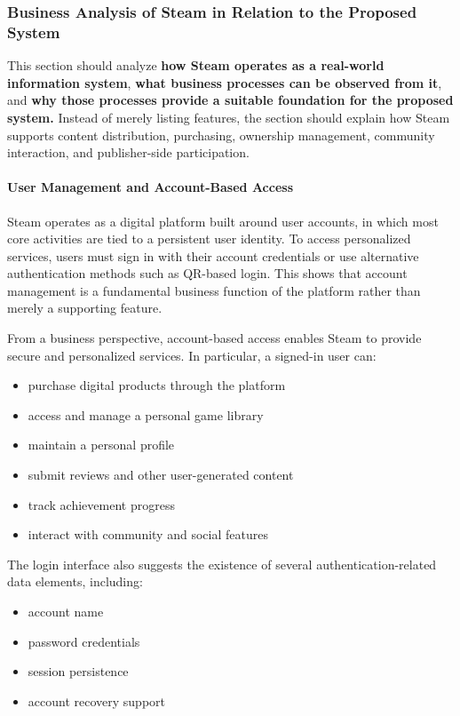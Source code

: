 \subsubsection{Business Analysis of Steam in Relation to the Proposed System}
This section should analyze \textbf{how Steam operates as a real-world information system}, \textbf{what business processes can be observed from it}, and \textbf{why those processes provide a suitable foundation for the proposed system.} Instead of merely listing features, the section should explain how Steam supports content distribution, purchasing, ownership management, community interaction, and publisher-side participation.
\paragraph{User Management and Account-Based Access}
Steam operates as a digital platform built around user accounts, in which most core activities are tied to a persistent user identity. To access personalized services, users must sign in with their account credentials or use alternative authentication methods such as QR-based login. This shows that account management is a fundamental business function of the platform rather than merely a supporting feature.

From a business perspective, account-based access enables Steam to provide secure and personalized services. In particular, a signed-in user can:
\begin{itemize}
    \item purchase digital products through the platform
    \item access and manage a personal game library
    \item maintain a personal profile
    \item submit reviews and other user-generated content
    \item track achievement progress
    \item interact with community and social features
\end{itemize}

The login interface also suggests the existence of several authentication-related data elements, including:
\begin{itemize}
    \item account name
    \item password credentials
    \item session persistence
    \item account recovery support
\end{itemize}

